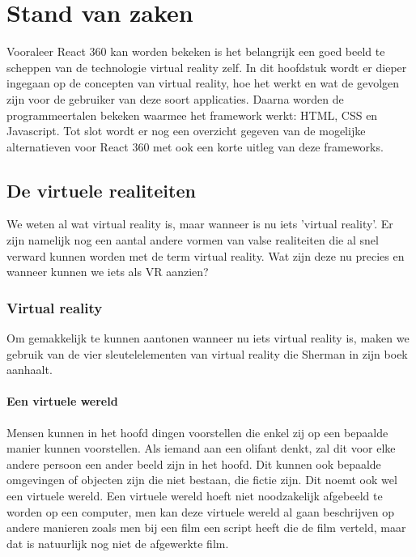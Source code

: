 \chapter{Stand van zaken}
\label{ch:stand-van-zaken}



Vooraleer React 360 kan worden bekeken is het belangrijk een goed beeld te scheppen van de technologie virtual reality zelf. In dit hoofdstuk wordt er dieper ingegaan op de concepten van virtual reality, hoe het werkt en wat de gevolgen zijn voor de gebruiker van deze soort applicaties. Daarna worden de programmeertalen bekeken waarmee het framework werkt: HTML, CSS en Javascript. Tot slot wordt er nog een overzicht gegeven van de mogelijke alternatieven voor React 360 met ook een korte uitleg van deze frameworks.

\section{De virtuele realiteiten}
\label{secvirtuele-realiteiten}
We weten al wat virtual reality is, maar wanneer is nu iets 'virtual reality'. Er zijn namelijk nog een aantal andere vormen van valse realiteiten die al snel verward kunnen worden met de term virtual reality. Wat zijn deze nu precies en wanneer kunnen we iets als VR aanzien?

\subsection{Virtual reality}
\label{subsec:virtual-reality}
Om gemakkelijk te kunnen aantonen wanneer nu iets virtual reality is, maken we gebruik van de vier sleutelelementen van virtual reality die Sherman in zijn boek aanhaalt. \autocite{Sherman2000} 

\subsubsection{Een virtuele wereld}
\label{ssubsec:virtuele-wereld}
Mensen kunnen in het hoofd dingen voorstellen die enkel zij op een bepaalde manier kunnen voorstellen. Als iemand aan een olifant denkt, zal dit voor elke andere persoon een ander beeld zijn in het hoofd. Dit kunnen ook bepaalde omgevingen of objecten zijn die niet bestaan, die fictie zijn. Dit noemt ook wel een virtuele wereld. Een virtuele wereld hoeft niet noodzakelijk afgebeeld te worden op een computer, men kan deze virtuele wereld al gaan beschrijven op andere manieren zoals men bij een film een script heeft die de film verteld, maar dat is natuurlijk nog niet de afgewerkte film.

